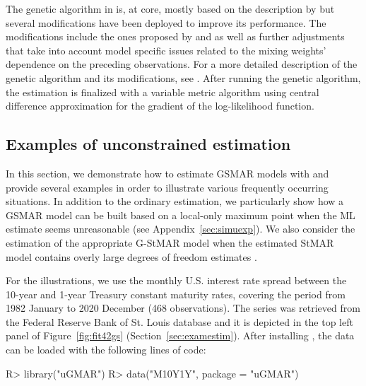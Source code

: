 \documentclass[nojss]{jss} %
\begin{document}
The genetic algorithm in  is, at core, mostly based on the description by \cite{Dorsey+Mayer:1995} but several modifications have been deployed to improve its performance. The modifications include the ones proposed by \cite{Patnaik+Srinivas:1994} and \cite{Smith+Dike+Stegmann:1995} as well as further adjustments that take into account model specific issues related to the mixing weights' dependence on the preceding observations. For a more detailed description of the genetic algorithm and its modifications, see \citet[Appendix A]{Virolainen:2020}. After running the genetic algorithm, the estimation is finalized with a variable metric algorithm \cite[algorithm 21, implemented by \citealp{R}]{Nash:1990} using central difference approximation for the gradient of the log-likelihood function.

\subsection{Examples of unconstrained estimation}\label{sec:example_estim}
In this section, we demonstrate how to estimate GSMAR models with  and provide several examples in order to illustrate various frequently occurring situations. In addition to the ordinary estimation, we particularly show how a GSMAR model can be built based on a local-only maximum point when the ML estimate seems unreasonable (see Appendix~\ref{sec:simuexp}). We also consider the estimation of the appropriate G-StMAR model when the estimated StMAR model contains overly large degrees of freedom estimates \citep[see][Section 4]{Virolainen:2020}.

For the illustrations, we use the monthly U.S. interest rate spread between the 10-year and 1-year Treasury constant maturity rates, covering the period from 1982 January to 2020 December (468 observations). The series was retrieved from the Federal Reserve Bank of St. Louis database and it is depicted in the top left panel of Figure~\ref{fig:fit42gs} (Section~\ref{sec:examestim}). After installing , the data can be loaded with the following lines of code:
%
\begin{CodeChunk}
\begin{CodeInput}
R> library("uGMAR")
R> data("M10Y1Y", package = "uGMAR")
\end{CodeInput}
\end{CodeChunk}
%
\end{document}
